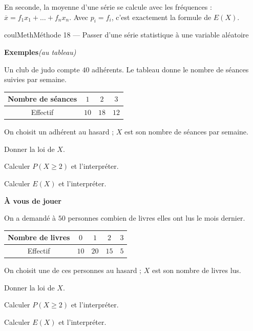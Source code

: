 \documentclass[11pt,a4paper]{article}
\makeatletter
\renewcommand{\ge}{\geqslant}
\newcounter{lycee@signet}
\newcommand{\signet}[3][]{\stepcounter{lycee@signet}%
  \edef\lycee@dest{\if\relax\detokenize{#1}\relax
    signet.\arabic{lycee@signet}\else#1\fi}%
  \hypertarget{\lycee@dest}{}\bookmark[level=#2,dest=\lycee@dest]{#3}}
\newcounter{methode}
\newenvironment{methodebox}[1][Méthode]{\stepcounter{methode}%
  \begin{boitecours}[phantom={\signet[methode-\arabic{methode}]{2}{#1}}]{coulMeth}{#1}}%
  {\end{boitecours}}
\newcommand{\etape}[1]{\par\smallskip\textbf{\color{coulMeth}#1}\par\nobreak\smallskip}
\newcommand{\autableau}{\hfill{\footnotesize\itshape\color{black!45}(au tableau)}}
\newcommand{\etapeexemples}{%
    \par\smallskip\textbf{\color{coulMeth}Exemples}\autableau\par\nobreak\smallskip}
\makeatother
\begin{document}
\begin{remarquebox}[Pourquoi ?]
En seconde, la moyenne d'une série se calcule avec les fréquences :
$\overline{x}=f_{1}x_{1}+\dots+f_{n}x_{n}$. Avec $p_{i}=f_{i}$, c'est exactement la
formule de $E(X)$.
\end{remarquebox}

\begin{methodebox}[Méthode 18 --- Passer d'une série statistique à une variable aléatoire]
\etapeexemples
Un club de judo compte $40$ adhérents. Le tableau donne le nombre de séances suivies par
semaine.
\begin{center}
\renewcommand{\arraystretch}{1.4}
\begin{tabular}{|c|c|c|c|}
\hline
Nombre de séances & $1$ & $2$ & $3$\\\hline
Effectif & $10$ & $18$ & $12$\\\hline
\end{tabular}
\end{center}
On choisit un adhérent au hasard ; $X$ est son nombre de séances par semaine.
\begin{questions}[label=\alph*)]
  \item Donner la loi de $X$.
  \item Calculer $P(X\ge 2)$ et l'interpréter.
  \item Calculer $E(X)$ et l'interpréter.
\end{questions}

\etape{À vous de jouer}
On a demandé à $50$ personnes combien de livres elles ont lus le mois dernier.
\begin{center}
\renewcommand{\arraystretch}{1.4}
\begin{tabular}{|c|c|c|c|c|}
\hline
Nombre de livres & $0$ & $1$ & $2$ & $3$\\\hline
Effectif & $10$ & $20$ & $15$ & $5$\\\hline
\end{tabular}
\end{center}
On choisit une de ces personnes au hasard ; $X$ est son nombre de livres lus.
\begin{questions}[label=\alph*)]
  \item Donner la loi de $X$.
  \item Calculer $P(X\ge 2)$ et l'interpréter.
  \item Calculer $E(X)$ et l'interpréter.
\end{questions}

\end{methodebox}
\end{document}
